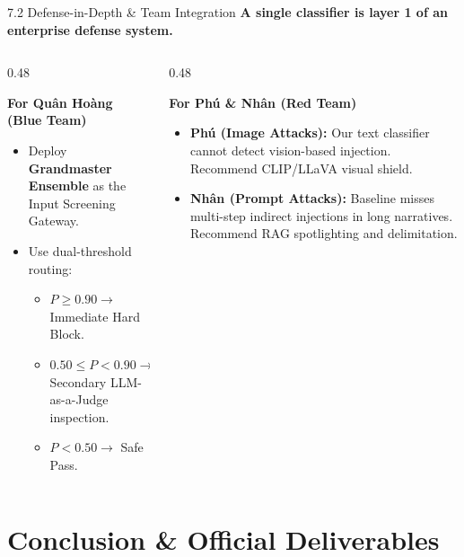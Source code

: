 \documentclass[aspectratio=169]{beamer}
\begin{document}
\begin{frame}{7.2 Defense-in-Depth \& Team Integration}
\textbf{A single classifier is layer 1 of an enterprise defense system.}

\vspace{0.2cm}
\begin{columns}[T]
\begin{column}{0.48\textwidth}
\begin{block}{\textbf{For Quân Hoàng (Blue Team)}}
\begin{itemize}
    \item Deploy \textbf{Grandmaster Ensemble} as the Input Screening Gateway.
    \item Use dual-threshold routing:
    \begin{itemize}
        \item $P \ge 0.90 \to$ Immediate Hard Block.
        \item $0.50 \le P < 0.90 \to$ Secondary LLM-as-a-Judge inspection.
        \item $P < 0.50 \to$ Safe Pass.
    \end{itemize}
\end{itemize}
\end{block}
\end{column}

\begin{column}{0.48\textwidth}
\begin{block}{\textbf{For Phú \& Nhân (Red Team)}}
\begin{itemize}
    \item \textbf{Phú (Image Attacks):} Our text classifier cannot detect vision-based injection. Recommend CLIP/LLaVA visual shield.
    \item \textbf{Nhân (Prompt Attacks):} Baseline misses multi-step indirect injections in long narratives. Recommend RAG spotlighting and delimitation.
\end{itemize}
\end{block}
\end{column}
\end{columns}
\end{frame}

\section{Conclusion \& Official Deliverables}
\end{document}
